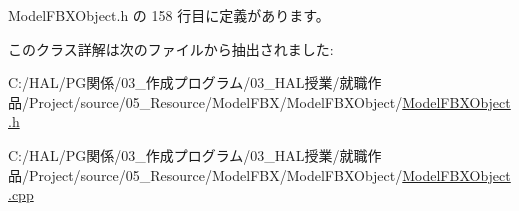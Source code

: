  Model\+F\+B\+X\+Object.\+h の 158 行目に定義があります。



このクラス詳解は次のファイルから抽出されました\+:\begin{DoxyCompactItemize}
\item 
C\+:/\+H\+A\+L/\+P\+G関係/03\+\_\+作成プログラム/03\+\_\+\+H\+A\+L授業/就職作品/\+Project/source/05\+\_\+\+Resource/\+Model\+F\+B\+X/\+Model\+F\+B\+X\+Object/\mbox{\hyperlink{_model_f_b_x_object_8h}{Model\+F\+B\+X\+Object.\+h}}\item 
C\+:/\+H\+A\+L/\+P\+G関係/03\+\_\+作成プログラム/03\+\_\+\+H\+A\+L授業/就職作品/\+Project/source/05\+\_\+\+Resource/\+Model\+F\+B\+X/\+Model\+F\+B\+X\+Object/\mbox{\hyperlink{_model_f_b_x_object_8cpp}{Model\+F\+B\+X\+Object.\+cpp}}\end{DoxyCompactItemize}
